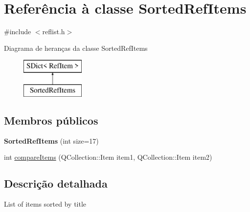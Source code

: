 \hypertarget{class_sorted_ref_items}{\section{Referência à classe Sorted\-Ref\-Items}
\label{class_sorted_ref_items}
}


{\ttfamily \#include $<$reflist.\-h$>$}

Diagrama de heranças da classe Sorted\-Ref\-Items\begin{figure}[H]
\begin{center}
\leavevmode
\includegraphics[height=2.000000cm]{class_sorted_ref_items}
\end{center}
\end{figure}
\subsection*{Membros públicos}
\begin{DoxyCompactItemize}
\item 
\hypertarget{class_sorted_ref_items_aa65174c2478a7664c75a68ceda914344}{{\bfseries Sorted\-Ref\-Items} (int size=17)}\label{class_sorted_ref_items_aa65174c2478a7664c75a68ceda914344}

\item 
int \hyperlink{class_sorted_ref_items_a219450accf048597ffc7113ecde4c402}{compare\-Items} (Q\-Collection\-::\-Item item1, Q\-Collection\-::\-Item item2)
\end{DoxyCompactItemize}


\subsection{Descrição detalhada}
List of items sorted by title 

